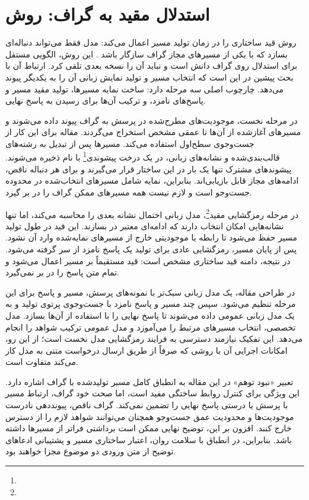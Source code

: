 \section{استدلال مقید به گراف: روش }

روش  قید ساختاری را در زمان تولید مسیر اعمال می‌کند: مدل فقط می‌تواند دنباله‌ای بسازد که با یکی از مسیرهای مجاز گراف سازگار باشد \cite{luo2025gcr}. این روش، الگویی مستقل برای استدلال روی گراف دانش است و نباید آن را نسخه بعدی  تلقی کرد. ارتباط آن با بحث پیشین در این است که انتخاب مسیر و تولید نمایش زبانی آن را به یکدیگر پیوند می‌دهد. چارچوب اصلی سه مرحله دارد: ساخت نمایه مسیرها، تولید مقید مسیر و پاسخ‌های نامزد، و ترکیب آن‌ها برای رسیدن به پاسخ نهایی.

در مرحله نخست، موجودیت‌های مطرح‌شده در پرسش به گراف پیوند داده می‌شوند و مسیرهای آغازشده از آن‌ها تا عمقی مشخص استخراج می‌گردند. مقاله برای این کار از جست‌وجوی سطح‌اول استفاده می‌کند. مسیرها پس از تبدیل به رشته‌های قالب‌بندی‌شده و نشانه‌های زبانی، در یک درخت پیشوندی\footnote{} با نام  ذخیره می‌شوند. پیشوندهای مشترک تنها یک بار در این ساختار قرار می‌گیرند و برای هر دنباله ناقص، ادامه‌های مجاز قابل بازیابی‌اند. بنابراین، نمایه شامل مسیرهای انتخاب‌شده در محدوده جست‌وجو است و لازم نیست همه مسیرهای ممکن گراف را در بر گیرد.

در مرحله رمزگشایی مقید\footnote{}، مدل زبانی احتمال نشانه بعدی را محاسبه می‌کند، اما تنها نشانه‌هایی امکان انتخاب دارند که ادامه‌ای معتبر در  بسازند. این قید در طول تولید مسیر حفظ می‌شود تا رابطه یا موجودیتی خارج از مسیرهای نمایه‌شده وارد آن نشود. پس از پایان مسیر، رمزگشایی عادی برای تولید یک پاسخ نامزد از سر گرفته می‌شود. در نتیجه، دامنه قید ساختاری مشخص است: قید مستقیماً بر مسیر اعمال می‌شود و تمام متن پاسخ را در بر نمی‌گیرد.

در طراحی مقاله، یک مدل زبانی سبک‌تر با نمونه‌های پرسش، مسیر و پاسخ برای این مرحله تنظیم می‌شود. سپس چند مسیر و پاسخ نامزد با جست‌وجوی پرتوی تولید و به یک مدل زبانی عمومی داده می‌شوند تا پاسخ نهایی را با استفاده از آن‌ها بسازد. مدل تخصصی، انتخاب مسیرهای مرتبط را می‌آموزد و مدل عمومی ترکیب شواهد را انجام می‌دهد. این تفکیک نیازمند دسترسی به فرایند رمزگشایی مدل نخست است؛ از این رو، امکانات اجرایی آن با روشی که صرفاً از طریق ارسال درخواست متنی به مدل کار می‌کند متفاوت است.

تعبیر «نبود توهم» در این مقاله به انطباق کامل مسیر تولیدشده با گراف اشاره دارد. این ویژگی برای کنترل روابط ساختگی مفید است، اما صحت خود گراف، ارتباط مسیر با پرسش یا درستی پاسخ نهایی را تضمین نمی‌کند. گراف ناقص، پیونددهی نادرست موجودیت‌ها و محدودیت عمق جست‌وجو همچنان می‌توانند شواهد لازم را از دسترس خارج کنند. افزون بر این، توضیح نهایی ممکن است برداشتی فراتر از مسیرها داشته باشد. بنابراین، در انطباق با سلامت روان، اعتبار ساختاری مسیر و پشتیبانی ادعاهای توضیح از متن ورودی دو موضوع مجزا خواهند بود.

